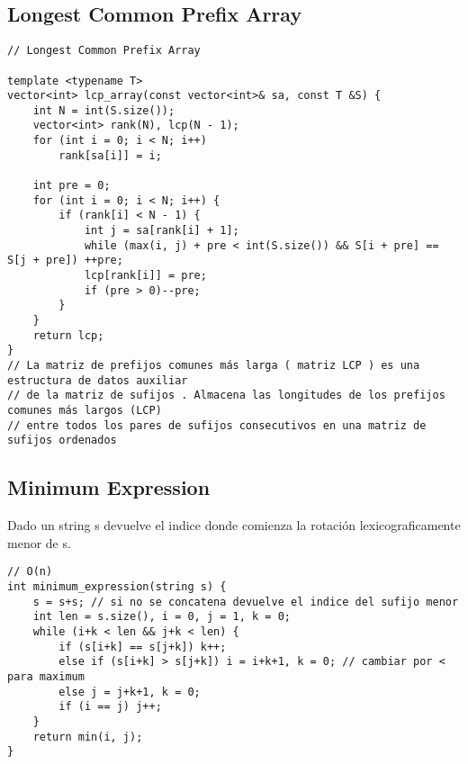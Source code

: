 \documentclass[10pt,letterpaper,twocolumn,twosided]{article}
\begin{document}
\subsection{Longest Common Prefix Array}
\begin{lstlisting}
// Longest Common Prefix Array

template <typename T>
vector<int> lcp_array(const vector<int>& sa, const T &S) {
    int N = int(S.size());
    vector<int> rank(N), lcp(N - 1);
    for (int i = 0; i < N; i++)
        rank[sa[i]] = i;

    int pre = 0;
    for (int i = 0; i < N; i++) {
        if (rank[i] < N - 1) {
            int j = sa[rank[i] + 1];
            while (max(i, j) + pre < int(S.size()) && S[i + pre] == S[j + pre]) ++pre;
            lcp[rank[i]] = pre;
            if (pre > 0)--pre;
        }
    }
    return lcp;
}
// La matriz de prefijos comunes más larga ( matriz LCP ) es una estructura de datos auxiliar
// de la matriz de sufijos . Almacena las longitudes de los prefijos comunes más largos (LCP)
// entre todos los pares de sufijos consecutivos en una matriz de sufijos ordenados
\end{lstlisting}

\subsection{Minimum Expression}
Dado un string s devuelve el indice donde comienza la rotación lexicograficamente menor de s.

\begin{lstlisting}
// O(n)
int minimum_expression(string s) {
    s = s+s; // si no se concatena devuelve el indice del sufijo menor
    int len = s.size(), i = 0, j = 1, k = 0;
    while (i+k < len && j+k < len) {
        if (s[i+k] == s[j+k]) k++;
        else if (s[i+k] > s[j+k]) i = i+k+1, k = 0; // cambiar por < para maximum
        else j = j+k+1, k = 0;
        if (i == j) j++;
    }
    return min(i, j);
}
\end{lstlisting}
\end{document}
